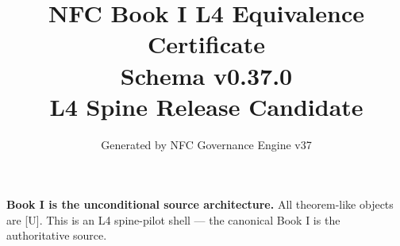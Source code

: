 \documentclass[11pt]{article}
\title{NFC Book I L4 Equivalence Certificate\\[1ex]\large Schema v0.37.0\\[0.5ex]\normalsize L4 Spine Release Candidate}
\author{Generated by NFC Governance Engine v37}
\date{}
\begin{document}
\maketitle
\tableofcontents
\bigskip
\noindent\textbf{Book I is the unconditional source architecture.} All theorem-like objects are [U].
This is an L4 spine-pilot shell --- the canonical Book I is the authoritative source.
\vspace{1em}

\end{document}
